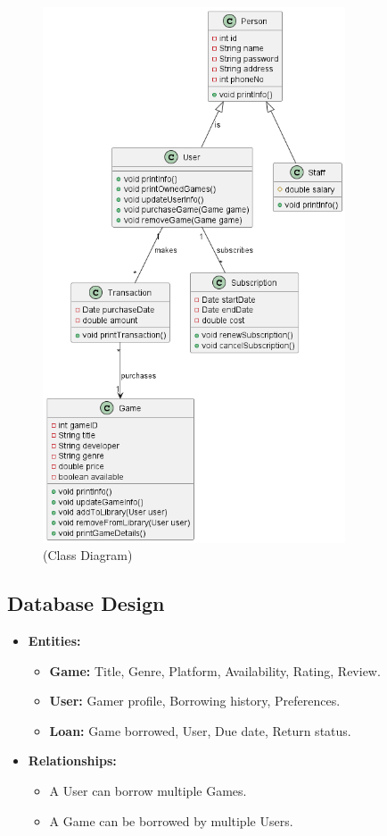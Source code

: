 \documentclass[paper=a4,fontsize=12pt,parskip=half*]{scrartcl}
\begin{document}
\begin{figure}[!ht]
	\centering
	\includegraphics[width=0.8\textwidth]{out/graphics/Charts/Klassendiagramm/Klassendiagramm.png}
	\caption{(Class Diagram)}
	\label{fig:class}
\end{figure}

\subsection{Database Design}
\begin{itemize}
	\item \textbf{Entities:}
	      \begin{itemize}
		      \item \textbf{Game:} Title, Genre, Platform, Availability, Rating, Review.
		      \item \textbf{User:} Gamer profile, Borrowing history, Preferences.
		      \item \textbf{Loan:} Game borrowed, User, Due date, Return status.
	      \end{itemize}
	\item \textbf{Relationships:}
	      \begin{itemize}
		      \item A User can borrow multiple Games.
		      \item A Game can be borrowed by multiple Users.
	      \end{itemize}
\end{itemize}
\end{document}
